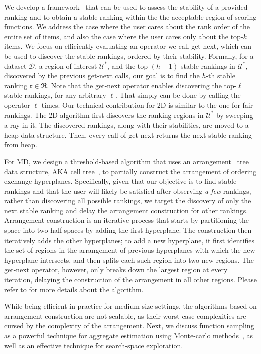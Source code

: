 We develop a framework~\cite{asudeh2018obtaining} that can be used to assess the stability of a provided ranking and to obtain a stable ranking within the the acceptable region of scoring functions.
We address the case where the user cares about the rank order of the entire set of items, and also the case where the user cares only about the top-$k$ items.
We focus on efficiently evaluating an operator we call {\sc \small get-next}, which can be used to discover the stable  rankings, ordered by their stability.
Formally, for a dataset $\mathcal{D}$, a region of interest $\mathcal{U}^*$, and the top-$(h-1)$ stable rankings in $\mathcal{U}^*$, discovered by the previous {\sc \small get-next} calls,  our goal is to find the $h$-th stable ranking $\mathfrak{r}\in\mathfrak{R}$.
Note that the {\sc \small get-next} operator enables discovering the top-$\ell$ stable rankings, for any arbitrary $\ell$. That simply can be done by calling the operator $\ell$ times.
Our technical contribution for 2D is similar to the one for fair rankings. The 2D algorithm first discovers the ranking regions in $\mathcal{U}^*$ by sweeping a ray in it. The discovered rankings, along with their stabilities, are moved to a heap data structure. Then, every call of {\sc \small get-next} returns the next stable ranking from heap.

For MD, we design a threshold-based algorithm that uses an arrangement~\cite{asudeh2019designing} tree data structure, AKA cell tree~\cite{tang2017determining}, to partially construct the arrangement of ordering exchange hyperplanes.
Specifically, given that our objective is to find stable rankings and that the user will likely be satisfied after observing {\em a few} rankings,  rather than discovering all possible rankings, we target the discovery of only the next stable ranking and delay the arrangement construction for other rankings. 
Arrangement construction is an iterative process that starts by partitioning the space into two half-spaces by adding the first hyperplane. The construction then iteratively adds the other hyperplanes; to add a new hyperplane, it first identifies the set of regions in the arrangement of previous hyperplanes with which the new hyperplane intersects, and then splits each such region into two new regions. The {\sc \small get-next} operator, however, only breaks down the largest region at every iteration, delaying the construction of the arrangement in all other regions. Please refer to \cite{asudeh2018obtaining} for more details about the algorithm.

While being efficient in practice for medium-size settings, the algorithms based on arrangement construction are not scalable, as their worst-case complexities are cursed by the complexity of the arrangement.
Next, we discuss function sampling as a powerful technique for aggregate estimation using Monte-carlo methods~\cite{montecarlo}, as well as an effective technique for search-space exploration.



